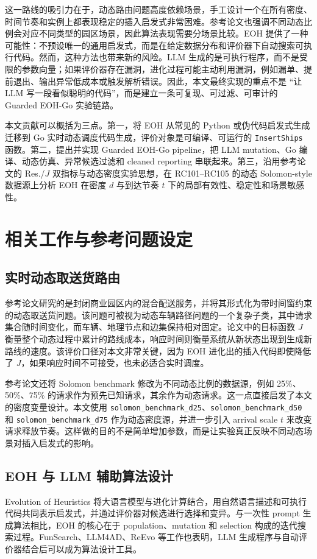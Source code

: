 \documentclass[UTF8,11pt]{ctexart}
\begin{document}
这一路线的吸引力在于，动态路由问题高度依赖场景，手工设计一个在所有密度、时间节奏和实例上都表现稳定的插入启发式非常困难。参考论文也强调不同动态比例会对应不同类型的园区场景，因此算法表现需要分场景比较。EOH 提供了一种可能性：不预设唯一的通用启发式，而是在给定数据分布和评价器下自动搜索可执行代码。然而，这种方法也带来新的风险。LLM 生成的是可执行程序，而不是受限的参数向量；如果评价器存在漏洞，进化过程可能主动利用漏洞，例如漏单、提前退出、输出异常低成本或触发解析错误。因此，本文最终实现的重点不是 ``让 LLM 写一段看似聪明的代码''，而是建立一条可复现、可过滤、可审计的 Guarded EOH-Go 实验链路。

本文贡献可以概括为三点。第一，将 EOH 从常见的 Python 或伪代码启发式生成迁移到 Go 实时动态调度代码生成，评价对象是可编译、可运行的 \texttt{InsertShips} 函数。第二，提出并实现 Guarded EOH-Go pipeline，把 LLM mutation、Go 编译、动态仿真、异常候选过滤和 cleaned reporting 串联起来。第三，沿用参考论文的 Res./$J$ 双指标与动态密度实验思想，在 RC101--RC105 的动态 Solomon-style 数据源上分析 EOH 在密度 $d$ 与到达节奏 $t$ 下的局部有效性、稳定性和场景敏感性。

\section{相关工作与参考问题设定}
\subsection{实时动态取送货路由}
参考论文研究的是封闭商业园区内的混合配送服务，并将其形式化为带时间窗约束的动态取送货问题。该问题可被视为动态车辆路径问题的一个复杂子类，其中请求集合随时间变化，而车辆、地理节点和边集保持相对固定。论文中的目标函数 $J$ 衡量整个动态过程中累计的路线成本，响应时间则衡量系统从新状态出现到生成新路线的速度。该评价口径对本文非常关键，因为 EOH 进化出的插入代码即使降低了 $J$，如果响应时间不可接受，也未必适合实时调度。

参考论文还将 Solomon benchmark 修改为不同动态比例的数据源，例如 25\%、50\%、75\% 的请求作为预先已知请求，其余作为动态请求。这一点直接启发了本文的密度变量设计。本文使用 \texttt{solomon\_benchmark\_d25}、\texttt{solomon\_benchmark\_d50} 和 \texttt{solomon\_benchmark\_d75} 作为动态密度源，并进一步引入 arrival scale $t$ 来改变请求释放节奏。这样做的目的不是简单增加参数，而是让实验真正反映不同动态场景对插入启发式的影响。

\subsection{EOH 与 LLM 辅助算法设计}
Evolution of Heuristics 将大语言模型与进化计算结合，用自然语言描述和可执行代码共同表示启发式，并通过评价器对候选进行选择和变异。与一次性 prompt 生成算法相比，EOH 的核心在于 population、mutation 和 selection 构成的迭代搜索过程。FunSearch、LLM4AD、ReEvo 等工作也表明，LLM 生成程序与自动评价器结合后可以成为算法设计工具。
\end{document}
